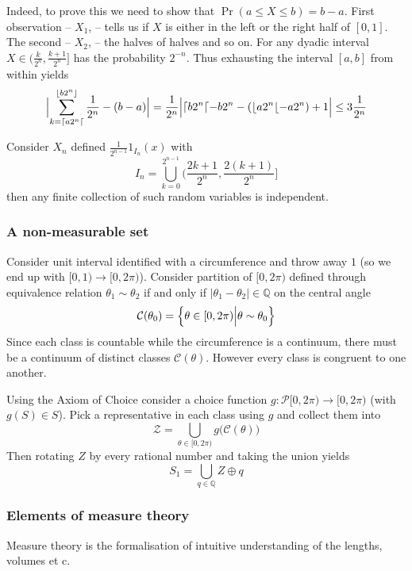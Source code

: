 \documentclass[a4paper]{article}
\begin{document}
Indeed, to prove this we need to show that $\Pr(a\leq X \leq b) = b-a$.
First observation -- $X_1$, -- tells us if $X$ is either in the left or the
right half of $[0,1]$. The second -- $X_2$, -- the halves of halves and so on.
For any dyadic interval $X\in(\frac{k}{2^n}, \frac{k+1}{2^n}]$ has the probability
$2^{-n}$. Thus exhausting the interval $[a,b]$ from within yields 
\[
\Bigl| \sum_{k=\lceil a2^n \lceil}^{\lfloor b2^n\rfloor} \frac{1}{2^n} - (b-a)\Bigr|
= \frac{1}{2^n}\Bigl| \lceil b2^n \lceil - b2^n - ( \lfloor a2^n \lfloor - a2^n ) + 1 \Bigr|
\leq 3 \frac{1}{2^n}
\]

Consider $X_n$ defined $\frac{1}{2^{n-1}}1_{I_n}(x)$ with 
\[I_n = \bigcup_{k=0}^{2^{n-1}}(\frac{2k+1}{2^n}, \frac{2(k+1)}{2^n}]\]
then any finite collection of such random variables is independent.

\subsubsection{A non-measurable set} %
\label{ssub:a_non_measurable_set}

Consider unit interval identified with a circumference and throw away $1$ (so we
end up with $[0,1)\to [0,2\pi)$). Consider partition of $[0,2\pi)$ defined through
equivalence relation $\theta_1\sim\theta_2$ if and only if $|\theta_1-\theta_2|\in \mathbb{Q}$
on the central angle
\[\mathcal{C}(\theta_0) = \Bigl\{\theta\in [0,2\pi)\Big\rvert \theta\sim \theta_0\Bigr\}\]
Since each class is countable while the circumference is a continuum, there must be
a continuum of distinct classes $\mathcal{C}(\theta)$. However every class is congruent
to one another.

Using the Axiom of Choice consider a choice function $g:\mathcal{P}[0,2\pi) \to [0,2\pi)$
(with $g(S)\in S$). Pick a representative in each class using $g$ and collect them
into
\[\mathcal{Z} = \bigcup_{\theta \in[0,2\pi)} g\bigl(\mathcal{C}(\theta)\bigr)\]
Then rotating $Z$ by every rational number and taking the union yields
\[S_1 = \bigcup_{q\in \mathbb{Q}} Z\oplus q\]


\subsubsection{Elements of measure theory} %
\label{ssub:elements_of_measure_theory}

Measure theory is the formalisation of intuitive understanding of the lengths,
volumes et c.
\end{document}
